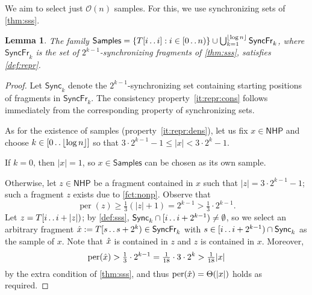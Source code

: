\documentclass[a4paper]{article}
\newtheorem{lemma}[theorem]{Lemma}
\theoremstyle{definition}
\theoremstyle{remark}
\newcommand{\R}{\mathsf{Samples}}
\newcommand{\N}{\mathsf{NHP}}
\newcommand{\floor}[1]{\left\lfloor #1 \right\rfloor}
\newcommand{\dd}{\mathinner{\ldotp\ldotp}}
\DeclareMathOperator{\per}{per}
\newcommand{\Oh}{\mathcal{O}}
\renewcommand{\S}{\mathsf{Sync}}
\renewcommand{\S}{\mathsf{Sync}}
\newcommand{\SF}{\mathsf{SyncFr}}
\begin{document}
We aim to select just $\Oh(n)$ samples.
For this, we use synchronizing sets of \cref{thm:sss}.
\begin{lemma}\label{lem:repr}
The family $\R = \{T[i\dd i] : i\in [0\dd n)\} \cup \bigcup_{k=1}^{\floor{\log n}} \SF_k$,
where $\SF_k$ is the set of $2^{k-1}$-synchronizing fragments of \cref{thm:sss}, satisfies \cref{def:repr}.
\end{lemma}
\begin{proof}
Let $\S_k$ denote the $2^{k-1}$-synchronizing set containing starting positions of fragments in $\SF_k$.
The consistency property~\ref{it:repr:cons} follows immediately from the 
corresponding property of synchronizing sets.

As for the existence of samples (property~\ref{it:repr:dens}),
let us fix $x\in \N$ and choose $k\in [0\dd \floor{\log n}]$
so that $3\cdot 2^{k-1}-1 \le |x|<  3\cdot 2^k-1$.

If $k=0$, then $|x|=1$, so $x\in \R$ can be chosen as its own sample.

Otherwise, let $z\in \N$ be a fragment contained in $x$ such that $|z|=3\cdot 2^{k-1}-1$; such a fragment $z$ exists due to \cref{fct:nonp}.
Observe that 
\[\per(z) \ge \tfrac13(|z|+1) = 2^{k-1} > \tfrac13 \cdot 2^{k-1}.\]
Let $z=T[i\dd i+|z|)$; by \cref{def:sss}, $\S_k\cap [i\dd i+2^{k-1})\ne \emptyset$,
so we select an arbitrary fragment $\rx:= T[s\dd s+2^k) \in \SF_k$ with $s\in [i\dd i+2^{k-1})\cap \S_k$ as the sample of $x$.
Note that $\hat{x}$ is contained in $z$ and $z$ is contained in $x$.
Moreover, \[ \per(\rx)> \tfrac13\cdot 2^{k-1}= \tfrac{1}{18}\cdot 3\cdot 2^k > \tfrac{1}{18}|x|\]
by the extra condition of \cref{thm:sss}, and thus $\per(\rx)=\Theta(|x|)$ holds as required.
\end{proof}
\end{document}

